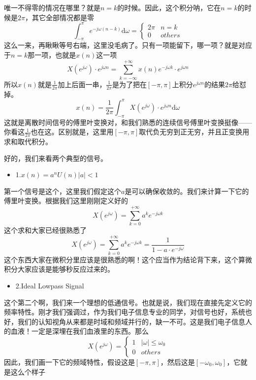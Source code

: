 \documentclass[a4paper,12pt]{article}
\begin{document}
唯一不得零的情况在哪里？就是$n= k$的时候。因此，这个积分呐，它在$n= k$的时候是$2\pi$，其它全部情况都是零
\begin{equation}
    \int_{-\pi}^{\pi}e^{-j\omega \left (n-k\right)}\text{d}\omega = \left\{\begin{matrix}
 2\pi & n=k\\
  0 & others
\end{matrix}\right.
\end{equation}
这么一来，再瞅瞅等号右端，这里没毛病了。只有一项能留下，哪一项？就是对应于$n= k$那一项，也就是$x(n)$这一项
\begin{equation}
    X\left (  e^{j\omega}\right )  \cdot e^{j\omega n} = \sum_{k=-\infty}^{+\infty}x(n)e^{-j\omega k}\cdot e^{j\omega n}
\end{equation}
所以$x(n)$就是$\frac{1}{2\pi}$加上后面一串，$\frac{1}{2\pi}$是为了把在$\left [-\pi ,\pi \right ]$上积分$e^{j\omega n}$的结果$2\pi$给怼掉。
\begin{equation}
    x(n)   = \frac{1}{2\pi}\int_{-\pi}^{\pi}X\left(e^{j\omega }\right)\cdot e^{j\omega n}\text{d}\omega
\end{equation}
这就是离散时间信号的傅里叶变换对，和我们熟悉的连续信号傅里叶变换挺像——你看这$\frac{1}{2\pi}$也在这。区别就是，这里用$\left [-\pi ,\pi \right ]$取代负无穷到正无穷，并且正变换用求和取代积分。

好的，我们来看两个典型的信号。
\begin{itemize}
    \item 1.\quad $x(n) = a^n U(n)$\quad $\left | a \right | <1$
\end{itemize}
第一个信号是这个，这里我们假定这个$a$是可以确保收敛的。我们来计算一下它的傅里叶变换。根据我们这里刚刚定义好的
\begin{equation}
    X\left (  e^{j\omega}\right )   = \sum_{k=0}^{+\infty}a^k e^{-j\omega k}
\end{equation}
这个求和大家已经很熟悉了
\begin{equation}
    X\left (  e^{j\omega}\right )   = \sum_{k=0}^{+\infty}a^k e^{-j\omega k}=\frac{1}{1-a\cdot e^{-j\omega }}
\end{equation}
这个东西大家在微积分里应该是很熟悉的啊！这个应当作为结论背下来，这个算微积分大家应该是能够秒反应过来的。
\begin{itemize}
    \item 2.\quad Ideal Lowpass Signal
\end{itemize}
这个第二个啊，我们来一个理想的低通信号。也就是说，我们现在直接先定义它的频率特性。刚才我们强调过，作为我们电子信息专业的同学，对信号也好，系统也好，我们的认知视角从来都是时域和频域并行的，缺一不可。这是我们电子信息人的血液！一定是深埋在我们血液里的东西。那么
\begin{equation}
    X\left ( e^{j\omega } \right)= \left\{\begin{matrix}
 1 & \left | \omega \right |\le \omega_0\\
  0 & others
\end{matrix}\right.
\end{equation}
因此，我们画一下它的频域特性，假设这是$\left [-\pi ,\pi \right ]$，然后这是$\left [-\omega_0 ,\omega_0 \right ]$，它就是这么个样子
\end{document}
